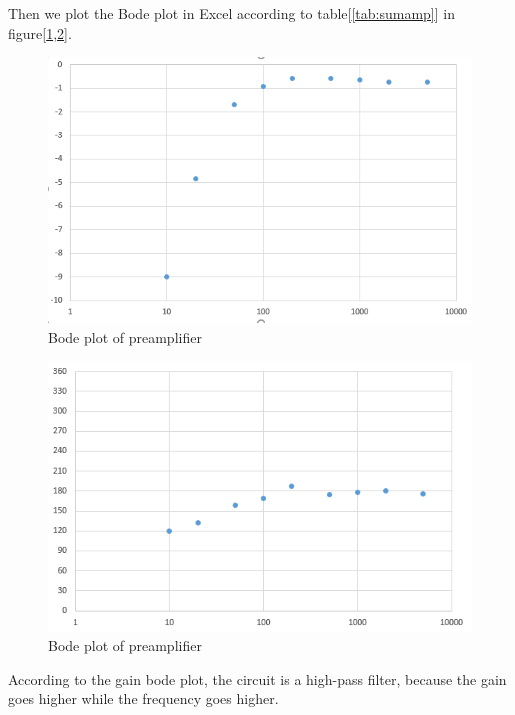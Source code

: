 \phantom{ } Then we plot the Bode plot in Excel according to table[\ref{tab:sumamp}] in figure[\ref{fig:106},\ref{fig:107}].
\begin{figure}[!htbp]
	\centering 
	\begin{framed}
		\includegraphics[width=\linewidth]{images/1_5.PNG} 
		\caption{Bode plot of preamplifier}
		\label{fig:106} 
	\end{framed}
\end{figure} 

\begin{figure}[!htbp]
	\centering 
	\begin{framed}
		\includegraphics[width=\linewidth]{images/1_6.PNG} 
		\caption{Bode plot of preamplifier}
		\label{fig:107} 
	\end{framed}
\end{figure}

\phantom{ } According to the gain bode plot, the circuit is a high-pass filter, because the gain goes higher while the frequency goes higher.

